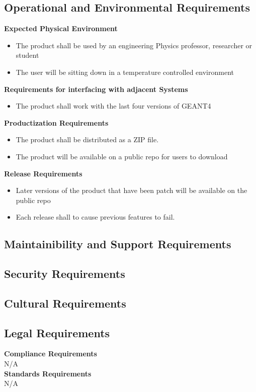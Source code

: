 \documentclass[12pt]{article}
\begin{document}
\subsection{Operational and Environmental Requirements} %
\textbf{Expected Physical Environment}
\begin{itemize}
	\item The product shall be used by an engineering Physics professor, researcher or student
	\item The user will be sitting down in a temperature controlled environment
\end{itemize}
\textbf{Requirements for interfacing with adjacent Systems}
\begin{itemize}
	\item The product shall work with the last four versions of GEANT4
\end{itemize}
\textbf{Productization Requirements}
\begin{itemize}
	\item The product shall be distributed as a ZIP file.
	\item The product will be available on a public repo for users to download
\end{itemize}
\textbf{Release Requirements}
\begin{itemize}
	\item Later versions of the product that have been patch will be available on the public repo
	\item Each release shall to cause previous features to fail.
\end{itemize}

\subsection{Maintainibility and Support Requirements} %
\subsection{Security Requirements} %
\subsection{Cultural Requirements} %
\subsection{Legal Requirements} %
\textbf{Compliance Requirements}\\
N/A\\
\textbf{Standards Requirements}\\
N/A\\
\end{document}
